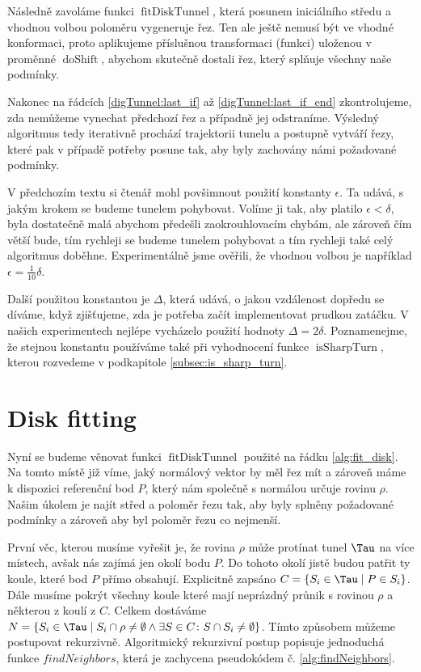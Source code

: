 Následně zavoláme funkci $ \operatorname{fitDiskTunnel} $, která posunem iniciálního
středu a vhodnou volbou poloměru vygeneruje řez. Ten ale ještě nemusí být ve vhodné
konformaci, proto aplikujeme příslušnou transformaci (funkci) uloženou v proměnné
$ \operatorname{doShift} $, abychom skutečně dostali řez, který splňuje všechny
naše podmínky.

Nakonec na řádcích \ref{digTunnel:last_if} až \ref{digTunnel:last_if_end}
zkontrolujeme, zda nemůžeme vynechat předchozí řez a případně jej odstraníme.
Výsledný algoritmus tedy iterativně prochází trajektorii tunelu a postupně vytváří řezy,
které pak v případě potřeby posune tak, aby byly zachovány námi požadované podmínky.

V předchozím textu si čtenář mohl povšimnout použití konstanty $ \epsilon $.
Ta udává, s jakým krokem se budeme tunelem pohybovat.
Volíme ji tak, aby platilo  $ \epsilon < \delta $, byla dostatečně malá abychom
předešli zaokrouhlovacím chybám, ale zároveň čím větší bude, tím rychleji se
budeme tunelem pohybovat a tím rychleji také celý algoritmus doběhne. Experimentálně
jsme ověřili, že vhodnou volbou je například $ \epsilon = \frac{1}{10} \delta $.

Další použitou konstantou je $ \Delta $, která udává, o jakou vzdálenost dopředu
se díváme, když zjišťujeme, zda je potřeba začít implementovat prudkou zatáčku.
V našich experimentech nejlépe vycházelo použití hodnoty $ \Delta = 2 \delta $.
Poznamenejme, že stejnou konstantu používáme také při vyhodnocení funkce
$ \operatorname{isSharpTurn} $, kterou rozvedeme v podkapitole \ref{subsec:is_sharp_turn}.




\section{Disk fitting} \label{subsec:disk_fit}
Nyní se budeme věnovat funkci $ \operatorname{fitDiskTunnel} $ použité na řádku
\ref{alg:fit_disk}. Na tomto místě již víme, jaký normálový vektor by měl řez mít a
zároveň máme k dispozici referenční bod $ P $, který nám společně s normálou
určuje rovinu $ \rho $. Našim úkolem je najít střed a poloměr řezu tak, aby
byly splněny požadované podmínky a zároveň aby byl poloměr řezu co nejmenší.

První věc, kterou musíme vyřešit je, že rovina $ \rho $ může protínat tunel $ \Tau $
na více místech, avšak nás zajímá jen okolí bodu $ P $. Do tohoto okolí jistě
budou patřit ty koule, které bod $ P $ přímo obsahují. Explicitně
zapsáno $ C = \{S_i \in \Tau \mid P \in S_i \} $. Dále musíme pokrýt všechny
koule které mají neprázdný průnik s rovinou $ \rho $ a některou z koulí z $ C $.
Celkem dostáváme
$ N = \{ S_i \in \Tau \mid S_i \cap \rho \neq \emptyset \wedge \exists S \in C \colon S \cap S_i \neq \emptyset  \}$.
Tímto způsobem můžeme postupovat rekurzivně. Algoritmický rekurzivní postup
popisuje jednoduchá funkce $ findNeighbors $, která je zachycena pseudokódem
č. \ref{alg:findNeighbors}.

